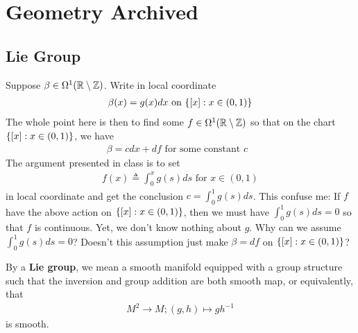 \documentclass{report}
\begin{document}
\chapter{Geometry Archived}
\section{Lie Group}
\begin{mdframed}
Suppose $\beta  \in \Omega^1 (\mathbb{R} \setminus \mathbb{Z})$. Write in local coordinate 
\begin{align*}
\beta  (x)=g(x)dx\text{ on }\{ [x]:x \in (0,1) \}
\end{align*}
The whole point here is then to find some $f \in \Omega^1 (\mathbb{R} \setminus \mathbb{Z})$ so that on the chart $\{ [x]: x \in (0,1) \}$, we have 
\begin{align*}
\beta = cdx + df\text{ for some constant $c$ }
\end{align*}
The argument presented in class is to set  
\begin{align*}
f(x)\triangleq \int_0^x g(s)ds\text{ for }x\in (0,1)
\end{align*}
in local coordinate and get the conclusion $c= \int_0^1 g(s)ds$. This confuse me: If $f$ have the above action on  $\{ [x]:x \in (0,1) \}$, then we must have $\int_0^1 g(s)ds=0$ so that $f$ is continuous. Yet, we don't know nothing about $g$. Why can we assume $\int_0^1 g(s)ds=0$? Doesn't this assumption just make $\beta =df$ on $\{ [x]: x\in (0,1) \}$?  
\end{mdframed}
\begin{mdframed}
By a \textbf{Lie group}, we mean a smooth manifold equipped with a group structure such that the inversion and group addition are both smooth map, or equivalently, that 
\begin{align*}
M^2\rightarrow  M; (g,h)\mapsto gh^{-1}
\end{align*}
is smooth. 
\end{mdframed}
\end{document}
